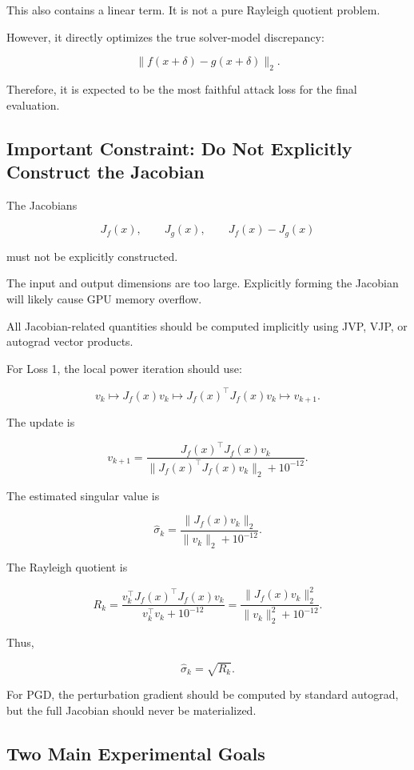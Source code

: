 \documentclass{article}
\begin{document}
This also contains a linear term. It is not a pure Rayleigh quotient problem.

However, it directly optimizes the true solver-model discrepancy:

\[
\|f(x+\delta)-g(x+\delta)\|_2.
\]

Therefore, it is expected to be the most faithful attack loss for the final evaluation.

\subsection{Important Constraint: Do Not Explicitly Construct the Jacobian}

The Jacobians

\[
J_f(x),
\qquad
J_g(x),
\qquad
J_f(x)-J_g(x)
\]

must not be explicitly constructed.

The input and output dimensions are too large. Explicitly forming the Jacobian will likely cause GPU memory overflow.

All Jacobian-related quantities should be computed implicitly using JVP, VJP, or autograd vector products.

For Loss 1, the local power iteration should use:

\[
v_k
\longmapsto
J_f(x)v_k
\longmapsto
J_f(x)^\top J_f(x)v_k
\longmapsto
v_{k+1}.
\]

The update is

\[
v_{k+1}
=
\frac{
J_f(x)^\top J_f(x)v_k
}{
\|J_f(x)^\top J_f(x)v_k\|_2 + 10^{-12}
}.
\]

The estimated singular value is

\[
\hat{\sigma}_k
=
\frac{
\|J_f(x)v_k\|_2
}{
\|v_k\|_2 + 10^{-12}
}.
\]

The Rayleigh quotient is

\[
R_k
=
\frac{
v_k^\top J_f(x)^\top J_f(x)v_k
}{
v_k^\top v_k + 10^{-12}
}
=
\frac{
\|J_f(x)v_k\|_2^2
}{
\|v_k\|_2^2 + 10^{-12}
}.
\]

Thus,

\[
\hat{\sigma}_k
=
\sqrt{R_k}.
\]

For PGD, the perturbation gradient should be computed by standard autograd, but the full Jacobian should never be materialized.

\subsection{Two Main Experimental Goals}
\end{document}
